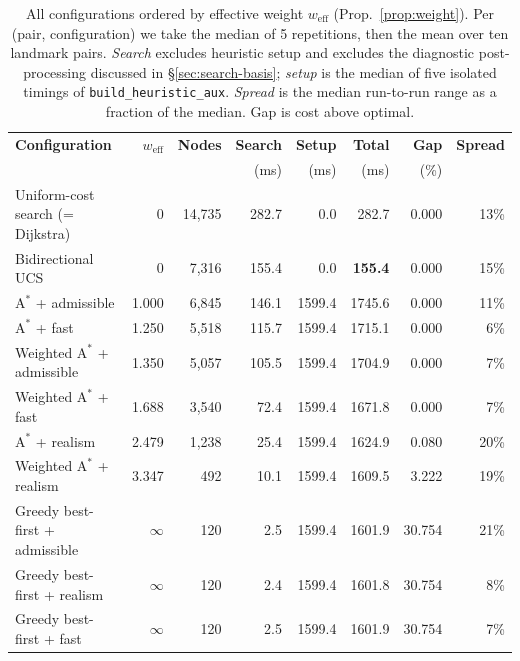 \documentclass[11pt]{article}
\newcommand{\weff}{w_{\mathrm{eff}}}
\begin{document}
\begin{table}[t]
\centering
\small
\caption{All configurations ordered by effective weight $\weff$ (Prop.~\ref{prop:weight}).
Per (pair, configuration) we take the median of 5 repetitions, then the mean over ten landmark
pairs. \emph{Search} excludes heuristic setup and excludes the diagnostic post-processing discussed
in \S\ref{sec:search-basis}; \emph{setup} is the median of five isolated timings of
\texttt{build\_heuristic\_aux}. \emph{Spread} is the median run-to-run range as a fraction of the
median. Gap is cost above optimal.}
\label{tab:weff}
\setlength{\tabcolsep}{4.5pt}
\begin{tabular}{@{}lrrrrrrr@{}}
\toprule
\textbf{Configuration} & $\weff$ & \textbf{Nodes} & \textbf{Search} & \textbf{Setup} &
\textbf{Total} & \textbf{Gap} & \textbf{Spread} \\
 & & & (ms) & (ms) & (ms) & (\%) & \\
\midrule
Uniform-cost search \small(= Dijkstra) & 0 & 14,735 & 282.7 & 0.0 & 282.7 & 0.000 & 13\% \\
Bidirectional UCS          & 0     & 7,316  & 155.4 & 0.0    & \textbf{155.4}  & 0.000 & 15\% \\
$\mathrm{A}^*$ + admissible          & 1.000 & 6,845  & 146.1 & 1599.4 & 1745.6 & 0.000 & 11\% \\
$\mathrm{A}^*$ + fast                & 1.250 & 5,518  & 115.7 & 1599.4 & 1715.1 & 0.000 & \phantom{0}6\% \\
Weighted $\mathrm{A}^*$ + admissible & 1.350 & 5,057  & 105.5 & 1599.4 & 1704.9 & 0.000 & \phantom{0}7\% \\
Weighted $\mathrm{A}^*$ + fast       & 1.688 & 3,540  & \phantom{0}72.4  & 1599.4 & 1671.8 & 0.000 & \phantom{0}7\% \\
$\mathrm{A}^*$ + realism             & 2.479 & 1,238  & \phantom{0}25.4  & 1599.4 & 1624.9 & 0.080 & 20\% \\
Weighted $\mathrm{A}^*$ + realism    & 3.347 & 492   & \phantom{0}10.1  & 1599.4 & 1609.5 & 3.222 & 19\% \\
Greedy best-first + admissible & $\infty$ & 120 & \phantom{00}2.5 & 1599.4 & 1601.9 & 30.754 & 21\% \\
Greedy best-first + realism    & $\infty$ & 120 & \phantom{00}2.4 & 1599.4 & 1601.8 & 30.754 & \phantom{0}8\% \\
Greedy best-first + fast       & $\infty$ & 120 & \phantom{00}2.5 & 1599.4 & 1601.9 & 30.754 & \phantom{0}7\% \\
\bottomrule
\end{tabular}
\end{table}
\end{document}
